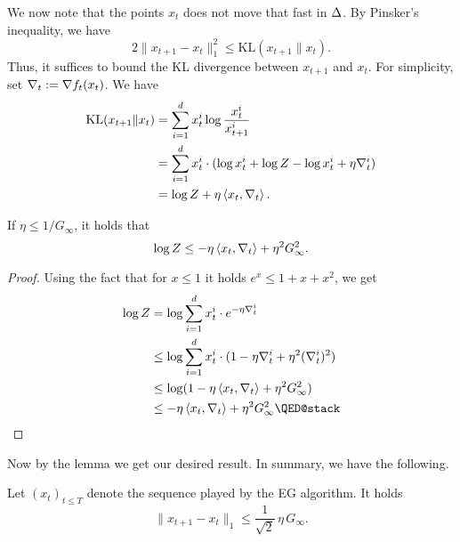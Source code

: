 We now note that the points $x_t$ does not move that fast in $\Delta$. By Pinsker's inequality, we have
\[
    2\|x_{t+1} - x_t\|_1^2 \leq \mathrm{KL}(x_{t+1}\|x_t).
\]
Thus, it suffices to bound the KL divergence between $x_{t+1}$ and $x_t$. For simplicity, set $\nabla_t := \nabla f_t(x_t)$. We have
\begin{align*}
    \mathrm{KL}(x_{t+1}\|x_t) &= \sum_{i=1}^d x_t^i \log\frac{x_t^i}{x_{t+1}^i} \\
                              &= \sum_{i=1}^d x_t^i \cdot (\log x_t^i + \log Z - \log x_{t}^i + \eta \nabla_t^i) \\
                              &= \log Z + \eta \left\langle x_t,\nabla_t \right\rangle.
\end{align*}
\begin{lemma}
    If $\eta \leq 1/G_\infty$, it holds that
    \[
        \log Z \leq -\eta\left\langle x_t,\nabla_t \right\rangle + \eta^2 G_\infty^2.
    \]
\end{lemma}
\begin{proof}
    Using the fact that for $x \leq 1$ it holds $e^x \leq 1 + x + x^2$, we get
    \begin{align*}
        \log Z &= \log \sum_{i=1}^d x_t^i \cdot e^{-\eta \grad_t^i} \\
               &\leq \log \sum_{i=1}^d x_t^i\cdot (1 - \eta\grad_t^i + \eta^2(\grad_t^i)^2) \\
               &\leq \log (1 - \eta\inner{x_t}{\grad_t} + \eta^2G_\infty^2) \\
               &\leq - \eta\inner{x_t}{\grad_t} + \eta^2G_\infty^2 \qedhere
    \end{align*}
\end{proof}

Now by the lemma we get our desired result. In summary, we have the following.
\begin{proposition}
    Let $(x_t)_{t\leq T}$ denote the sequence played by the EG algorithm. It holds
    \[
        \|x_{t+1} - x_t\|_1 \leq \frac{1}{\sqrt{2}}\,\eta\, G_\infty.
    \]
\end{proposition}


